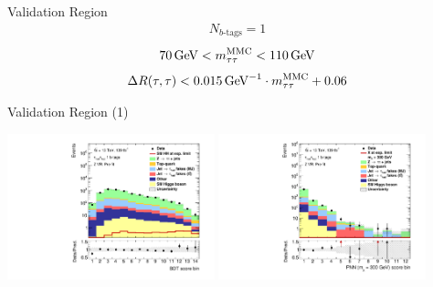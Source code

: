 \documentclass[11pt, xcolor={dvipsnames}, aspectratio=169, notes]{beamer}
\begin{document}

\begin{frame}{ Validation Region}
  \begin{align*}
    N_{b\text{-tags}} = 1
  \end{align*}
  \begin{align*}
    \SI{70}{\GeV} < \mMMC < \SI{110}{\GeV}
  \end{align*}
  \begin{align*}
    \dRtautau < \SI{0.015}{\per\GeV} \cdot \mMMC + 0.06
  \end{align*}
\end{frame}


\begin{frame}{ Validation Region (1)}
  \centering

  \includegraphics[width=0.45\textwidth]{vrplots/zvr/Region_BMin0_incJet1_distSMBDT_J2_Y2015_DLLOS_T1_SpcTauHH_L0_Prefitlog}%
  \hfill%
  \includegraphics[width=0.45\textwidth]{vrplots/zvr/Region_BMin0_incJet1_distPNN300_J2_Y2015_DLLOS_T1_SpcTauHH_L0_Prefitlog}
\end{frame}

\end{document}

